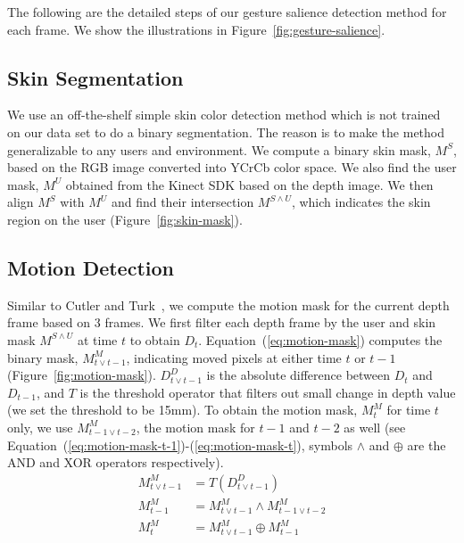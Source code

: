 \documentclass{sigchi}
\begin{document}
The following are the detailed steps of our gesture salience detection method for each frame. 
We show the illustrations in Figure~\ref{fig:gesture-salience}. 

\subsection{Skin Segmentation}
We use an off-the-shelf simple skin color detection method which is not trained on our data set to do a binary segmentation. The reason is
to make the method generalizable to any users and environment. We compute a binary skin mask, $M^S$, based on the RGB image converted into YCrCb
color space.  We also find the user mask, $M^U$ obtained from the Kinect SDK based on the depth image. 
We then align $M^S$ with $M^U$ and find their intersection $M^{S\wedge U}$, which indicates the skin region on the user (Figure~\ref{fig:skin-mask}).

\subsection{Motion Detection}
Similar to Cutler and Turk~\cite{cutler1998}, we compute the motion mask for the current depth frame based on 3 frames. We first filter each 
depth frame by the user and skin mask $M^{S\wedge U}$ at time $t$ to obtain $D_t$. 
Equation~(\ref{eq:motion-mask}) computes the binary mask, $M_{t\vee t-1}^M$, indicating moved pixels at either time $t$ or $t - 1$ (Figure~\ref{fig:motion-mask}).
$D_{t\vee t-1}^{D}$ is the absolute difference between $D_t$ and $D_{t-1}$, and $T$ is the threshold operator that filters out small change in depth value 
(we set the threshold to be 15mm). 
To obtain the motion mask, $M_{t}^M$ for time $t$ only, we use $M_{t-1\vee t-2}^M$, the motion mask for $t-1$ and $t-2$ as well (see Equation~(\ref{eq:motion-mask-t-1})-(\ref{eq:motion-mask-t}),
symbols $\wedge$ and $\oplus$ are the AND and XOR operators respectively).
\begin{align}
M_{t\vee t-1}^M &= T(D_{t\vee t-1}^{D}) \label{eq:motion-mask} \\
M_{t-1}^M &= M_{t\vee t-1}^M \wedge M_{t-1\vee t-2}^M \label{eq:motion-mask-t-1}\\
M_{t}^M &= M_{t\vee t-1}^M \oplus M_{t-1}^M \label{eq:motion-mask-t}
\end{align}
\end{document}
